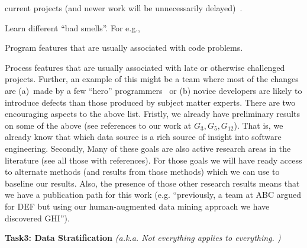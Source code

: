 current projects (and newer work will be unnecessarily delayed)~\cite{rodriguez2012empirical}.
\item[$G_{12}=$]
Learn different ``bad smells''. For e.g.,
    \bi
        \item[$G_{12a}=$] Program features that are usually associated with code problems.
        \item[$G_{12b}=$] Process features that are usually associated with late or otherwise challenged projects. Further, an example of this might be a team  where most of the changes are (a)~made by a few  ``hero'' programmers~\cite{agrawal17hero} or (b) novice developers are likely to introduce defects than those produced by subject matter experts.
    \ei
\ei
There are two encouraging aspects to the above list. Fristly, 
we already have preliminary results on some of the above (see references to our work at $G_3,G_5, G_{12}$).  
That is, we already know that which data source is a rich source of insight into software engineering.
Secondly, 
Many of these goals are also active research areas in the literature (see all those with references). For those
goals we will have ready access to alternate methods (and results from those methods) which we can use to baseline
our results. Also, the presence of those other research results means that we have a publication path for this work
(e.g. ``previously, a team at ABC argued for DEF but using our human-augmented data mining approach we have discovered GHI'').


\noindent
{\bf Task3: Data Stratification} {\em  (a.k.a. Not everything applies to everything. )}
 
